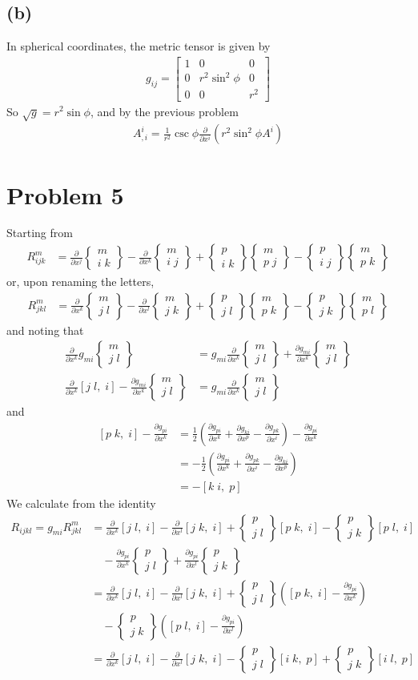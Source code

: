 \documentclass[12pt]{article}
\newcommand{\eq}[1]{\begin{align*}#1\end{align*}}
\newcommand{\p}[2]{\frac{\partial#1}{\partial#2}}
\newcommand{\mat}[2]{\left[\begin{array}{#1}#2\end{array}\right]}
\newcommand{\crsf}[3]{\left[#1\;#2,\;#3\right]}
\newcommand{\crss}[3]{\left\{\begin{array}{c}#1\\#2\;#3\end{array}\right\}}
\begin{document}
\subsection*{(b)}
In spherical coordinates, the metric tensor is given by
\eq{
	g_{ij} = \mat{ccc}{
		1 & 0 & 0\\
		0 & r^2\sin^2\phi & 0\\
		0 & 0 & r^2
	}
}
So $\sqrt{g} = r^2\sin\phi$, and by the previous problem
\eq{
	A^i_{,i} = \frac{1}{r^2}\csc\phi \p{}{x^i}\left(r^2\sin^2\phi A^i\right)
}
\section*{Problem 5}
Starting from
\eq{
	R_{ijk}^m &= \p{}{x^j}\crss{m}{i}{k} - \p{}{x^k}\crss{m}{i}{j} + \crss{p}{i}{k}\crss{m}{p}{j} - \crss{p}{i}{j}\crss{m}{p}{k}
}
or, upon renaming the letters,
\eq{
	R_{jkl}^m &= \p{}{x^k}\crss{m}{j}{l} - \p{}{x^l}\crss{m}{j}{k} + \crss{p}{j}{l}\crss{m}{p}{k} - \crss{p}{j}{k}\crss{m}{p}{l}
}
and noting that
\eq{
	\p{}{x^k}g_{mi}\crss{m}{j}{l} &= g_{mi}\p{}{x^k}\crss{m}{j}{l} + \p{g_{mi}}{x^k}\crss{m}{j}{l}\\
	\p{}{x^k}\crsf{j}{l}{i} - \p{g_{mi}}{x^k}\crss{m}{j}{l} &= g_{mi}\p{}{x^k}\crss{m}{j}{l}
}
and
\eq{
	\crsf{p}{k}{i} - \p{g_{pi}}{x^k} &= \frac{1}{2}\left(\p{g_{pi}}{x^k} + \p{g_{ki}}{x^p} - \p{g_{pk}}{x^i}\right) - \p{g_{pi}}{x^k}\\
	&= -\frac{1}{2}\left(\p{g_{pi}}{x^k} + \p{g_{pk}}{x^i} - \p{g_{ki}}{x^p}\right)\\
	&= -\crsf{k}{i}{p}
}
We calculate from the identity
\eq{
	R_{ijkl} = g_{mi} R_{jkl}^m &= \p{}{x^k}\crsf{j}{l}{i} - \p{}{x^l}\crsf{j}{k}{i} + \crss{p}{j}{l}\crsf{p}{k}{i} - \crss{p}{j}{k}\crsf{p}{l}{i}\\
	&\quad - \p{g_{pi}}{x^k}\crss{p}{j}{l} + \p{g_{pi}}{x^l}\crss{p}{j}{k}\\
	&= \p{}{x^k}\crsf{j}{l}{i} - \p{}{x^l}\crsf{j}{k}{i} + \crss{p}{j}{l}\left(\crsf{p}{k}{i} - \p{g_{pi}}{x^k}\right)\\
	&\quad - \crss{p}{j}{k}\left(\crsf{p}{l}{i} - \p{g_{pi}}{x^l}\right) \\
	&= \p{}{x^k}\crsf{j}{l}{i} - \p{}{x^l}\crsf{j}{k}{i} - \crss{p}{j}{l}\crsf{i}{k}{p} + \crss{p}{j}{k}\crsf{i}{l}{p}
}
\end{document}
